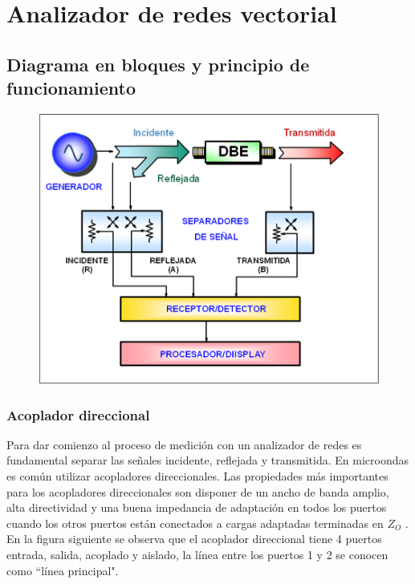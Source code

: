 \documentclass[a4paper,12pt,twoside]{article}
\begin{document}


\newpage
\vfill
\tableofcontents
\vfill

\newpage

\section{Analizador de redes vectorial}
\subsection{Diagrama en bloques y principio de funcionamiento}

\begin{figure}[H]
    \includegraphics[width=\textwidth]{../img/analizador_redes.png}
\end{figure}

\subsubsection{Acoplador direccional}
Para dar comienzo al proceso de medición con un analizador de redes es fundamental separar
las señales incidente, reflejada y transmitida. En microondas es común utilizar acopladores
direccionales. Las propiedades más importantes para los acopladores direccionales son
disponer de un ancho de banda amplio, alta directividad y una buena impedancia de
adaptación en todos los puertos cuando los otros puertos están conectados a cargas
adaptadas terminadas en $Z_O$ .
En la figura siguiente se observa que el acoplador direccional tiene 4 puertos entrada, salida,
acoplado y aislado, la línea entre los puertos 1 y 2 se conocen como “línea principal".
\end{document}
